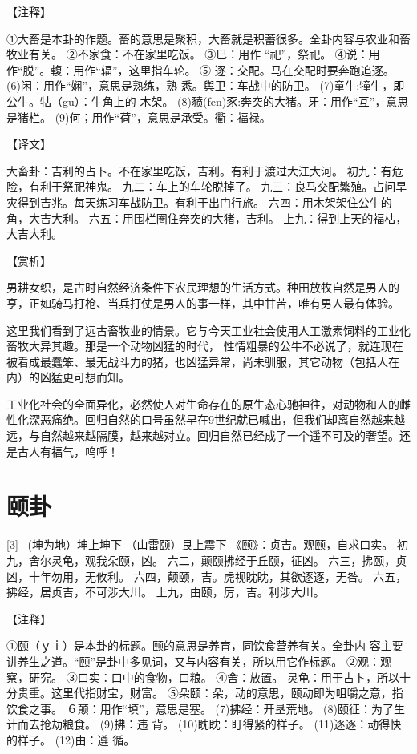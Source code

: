 \documentclass[12pt,UTF8]{ctexbook}
\begin{document}
【注释】

①大畜是本卦的作题。畜的意思是聚积，大畜就是积蓄很多。全卦内容与农业和畜牧业有关。
②不家食：不在家里吃饭。
③巳：用作 “祀”，祭祀。
④说：用作“脱”。輹：用作“辐”，这里指车轮。
⑤ 逐：交配。马在交配时要奔跑追逐。
(6)闲：用作“娴”，意思是熟练，熟 悉。舆卫：车战中的防卫。
(7)童牛:犝牛，即公牛。牯（gu）：牛角上的 木架。
(8)豮(fen)豕:奔突的大猪。牙：用作“互”，意思是猪栏。
(9)何；用作“荷”，意思是承受。衢：福禄。

【译文】

大畜卦：吉利的占卜。不在家里吃饭，吉利。有利于渡过大江大河。
初九：有危险，有利于祭祀神鬼。
九二：车上的车轮脱掉了。
九三：良马交配繁殖。占问旱灾得到吉兆。每天练习车战防卫。有利于出门行旅。
六四：用木架架住公牛的角，大吉大利。
六五：用围栏圈住奔突的大猪，吉利。
上九：得到上天的福枯，大吉大利。

【赏析】

男耕女织，是古时自然经济条件下农民理想的生活方式。种田放牧自然是男人的亨，正如骑马打枪、当兵打仗是男人的事一样，其中甘苦，唯有男人最有体验。

这里我们看到了远古畜牧业的情景。它与今天工业社会使用人工激素饲料的工业化畜牧大异其趣。那是一个动物凶猛的时代， 性情粗暴的公牛不必说了，就连现在被看成最蠢笨、最无战斗力的猪，也凶猛异常，尚未驯服，其它动物（包括人在内）的凶猛更可想而知。

工业化社会的全面异化，必然使人对生命存在的原生态心驰神往，对动物和人的雌性化深恶痛绝。回归自然的口号虽然早在9世纪就已喊出，但我们却离自然越来越远，与自然越来越隔膜，越来越对立。回归自然已经成了一个遥不可及的奢望。还是古人有福气，呜呼！

\chapter{颐卦}
[3] \ (坤为地）坤上坤下
（山雷颐）艮上震下
《颐》：贞吉。观颐，自求口实。
初九，舍尔灵龟，观我朵颐，凶。
六二，颠颐拂经于丘颐，征凶。
六三，拂颐，贞凶，十年勿用，无攸利。
六四，颠颐，吉。虎视眈眈，其欲逐逐，无咎。
六五，拂经，居贞吉，不可涉大川。
上九，由颐，厉，吉。利涉大川。

【注释】

①颐（ｙｉ）是本卦的标题。颐的意思是养育，同饮食营养有关。全卦内 容主要讲养生之道。“颐”是卦中多见词，又与内容有关，所以用它作标题。
②观：观察，研究。
③口实：口中的食物，口粮。
④舍：放置。 灵龟：用于占卜，所以十分贵重。这里代指财宝，财富。
⑤朵颐：朵，动的意思，颐动即为咀嚼之意，指饮食之事。
６颠：用作“填”，意思是塞。
(7)拂经：开垦荒地。
(8)颐征：为了生计而去抢劫粮食。
(9)拂：违 背。
(10)眈眈：盯得紧的样子。
(11)逐逐：动得快的样子。
(12)由：遵 循。
\end{document}
